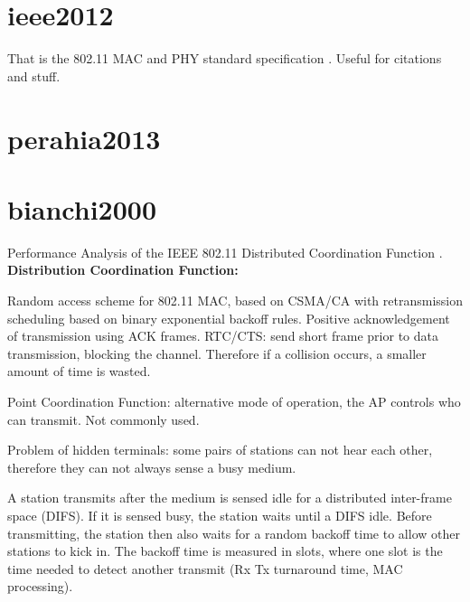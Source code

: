 
\section*{ieee2012}

That is the 802.11 MAC and PHY standard specification \cite{ieee2012}. Useful for citations and stuff.



\section*{perahia2013}





\section*{bianchi2000}

Performance Analysis of the IEEE 802.11 Distributed Coordination Function \cite{bianchi2000}.\\

\textbf{Distribution Coordination Function:}

Random access scheme for 802.11 MAC, based on CSMA/CA with retransmission scheduling based on binary exponential backoff rules. Positive acknowledgement of transmission using ACK frames. RTC/CTS: send short frame prior to data transmission, blocking the channel. Therefore if a collision occurs, a smaller amount of time is wasted.

Point Coordination Function: alternative mode of operation, the AP controls who can transmit. Not commonly used.

Problem of hidden terminals: some pairs of stations can not hear each other, therefore they can not always sense a busy medium.

A station transmits after the medium is sensed idle for a distributed inter-frame space (DIFS). If it is sensed busy, the station waits until a DIFS idle. Before transmitting, the station then also waits for a random backoff time to allow other stations to kick in. The backoff time is measured in slots, where one slot is the time needed to detect another transmit (Rx Tx turnaround time, MAC processing).

